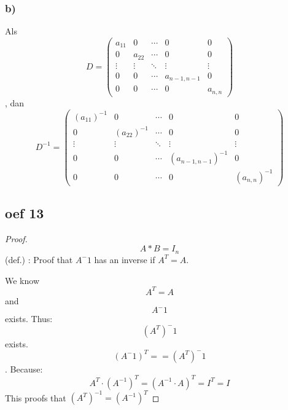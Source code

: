 \documentclass[10pt,a4paper]{article}
\begin{document}
\subsubsection*{b)}
Als
$$ D = \begin{pmatrix}
a_{11} & 0 & \cdots & 0 & 0\\
0 & a_{22} & \cdots & 0 & 0\\
\vdots & \vdots & \ddots & \vdots & \vdots\\
0 & 0 & \cdots & a_{n-1,n-1} & 0 \\
0 & 0 & \cdots & 0 & a_{n,n}
\end{pmatrix}
$$, dan
$$ D^{-1} = \begin{pmatrix}
(a_{11})^{-1} & 0 & \cdots & 0 & 0\\
0 & (a_{22})^{-1} & \cdots & 0 & 0\\
\vdots & \vdots & \ddots & \vdots & \vdots\\
0 & 0 & \cdots & (a_{n-1,n-1})^{-1} & 0 \\
0 & 0 & \cdots & 0 & (a_{n,n})^{-1}
\end{pmatrix}
$$

\subsection*{oef 13}

\begin{proof}

\[A*B = I_{n} \] (def.) : Proof that $A^-1$ has an inverse if $ A^T = A $.

We know \[A^T = A \] and \[ A^-1 \] exists.
Thus: \[(A^T)^-1 \] exists.
\[ (A^-1)^T ==  (A^T)^-1 \].
Because:
$$A^T\cdot (A^{-1})^T = (A^{-1}\cdot A)^T = I^T = I$$
This proofs that $(A^T)^{-1} = (A^{-1})^T$
\end{proof}
\end{document}
